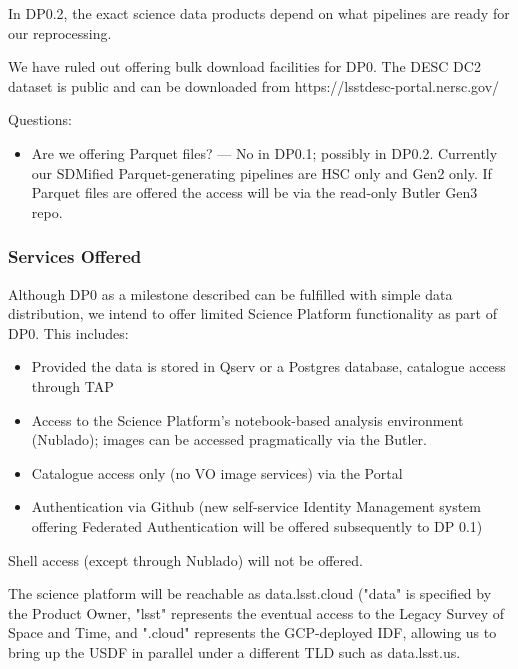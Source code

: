 In DP0.2, the exact science data products depend on what pipelines are ready for our reprocessing.

We have ruled out offering bulk download facilities for DP0.
The DESC DC2 dataset is public and can be downloaded from https://lsstdesc-portal.nersc.gov/

Questions:

\begin{itemize}

\item Are we offering Parquet files? --- No in DP0.1; possibly in DP0.2. Currently our SDMified Parquet-generating pipelines are HSC only and Gen2 only. If Parquet files are offered the access will be via the read-only Butler Gen3 repo.


\end{itemize}

\subsubsection{Services Offered}

Although DP0 as a milestone described  can be fulfilled with simple data distribution, we intend to offer limited Science Platform functionality as part of DP0. This includes:

\begin{itemize}

\item Provided the data is stored in Qserv or a Postgres database, catalogue access through TAP

\item Access to the Science Platform's notebook-based analysis environment (Nublado); images can be accessed pragmatically via the Butler.

\item Catalogue access only (no VO image services) via the Portal

\item Authentication via Github (new self-service Identity Management system offering Federated Authentication will be offered subsequently to DP 0.1)

\end{itemize}

Shell access (except through Nublado) will not be offered.

The science platform will be reachable as data.lsst.cloud ("data" is specified by the Product Owner, "lsst" represents the eventual access to the Legacy Survey of Space and Time, and ".cloud" represents the GCP-deployed IDF, allowing us to bring up the USDF in parallel under a different TLD such as data.lsst.us.

